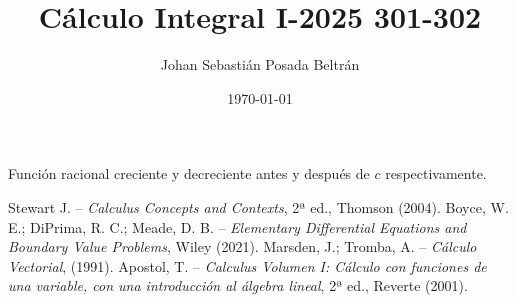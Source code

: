 \documentclass{article}
\title{Cálculo Integral I-2025 301-302}
\author{Johan Sebastián Posada Beltrán}
\date{\today}
\begin{document}
\maketitle







Función racional creciente y decreciente antes y después de $c$ respectivamente.

\begin{thebibliography}{9}
     Stewart J. -- \emph{Calculus Concepts and Contexts}, 2ª ed., Thomson (2004).
     Boyce, W. E.; DiPrima, R. C.; Meade, D. B. -- \emph{Elementary Differential Equations and Boundary Value Problems}, Wiley (2021).
     Marsden, J.; Tromba, A. -- \emph{Cálculo Vectorial}, (1991).
     Apostol, T. -- \emph{Calculus Volumen I: Cálculo con funciones de una variable, con una introducción al álgebra lineal}, 2ª ed., Reverte (2001).
\end{thebibliography}
\end{document}
